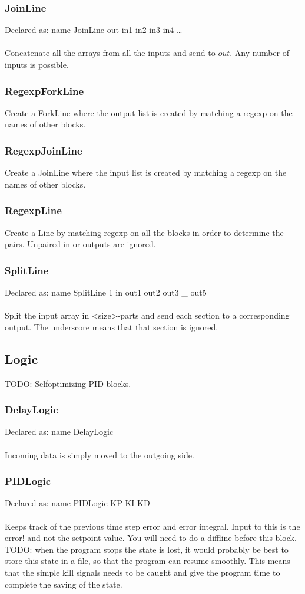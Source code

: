 \documentclass[a4paper]{article}
\begin{document}
\subsubsection{JoinLine}
Declared as: name JoinLine out in1 in2 in3 in4 \ldots\\\\
Concatenate all the arrays from all the inputs and send to $out$. Any number of inputs is possible.
\subsubsection{RegexpForkLine}
Create a ForkLine where the output list is created by matching a regexp on the names of other blocks.
\subsubsection{RegexpJoinLine}
Create a JoinLine where the input list is created by matching a regexp on the names of other blocks.
\subsubsection{RegexpLine}
Create a Line by matching regexp on all the blocks in order to determine the pairs. Unpaired in or outputs are ignored.
\subsubsection{SplitLine}
Declared as: name SplitLine 1 in out1 out2 out3 \_ out5\\\\
Split the input array in <size>-parts and send each section to a corresponding output. The underscore means that that section is ignored.
\subsection{Logic}
TODO: Selfoptimizing PID blocks.
\subsubsection{DelayLogic}
Declared as: name DelayLogic\\\\
Incoming data is simply moved to the outgoing side.
\subsubsection{PIDLogic}
Declared as: name PIDLogic KP KI KD\\\\
Keeps track of the previous time step error and error integral. Input to this is the error! and not the setpoint value. You will need to do a diffline before this block. TODO: when the program stops the state is lost, it would probably be best to store this state in a file, so that the program can resume smoothly. This means that the simple kill signals needs to be caught and give the program time to complete the saving of the state.\\
\end{document}
